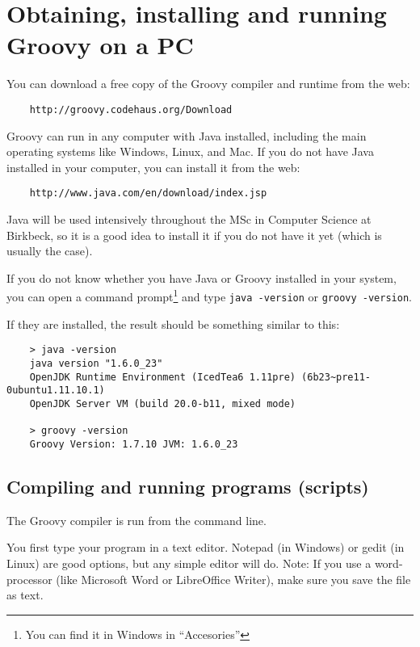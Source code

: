 \section{Obtaining, installing and running Groovy on a PC}
\label{sec:obta-inst-runn}
 
You can download a free copy of the Groovy compiler and runtime from the web:

\begin{verbatim}
    http://groovy.codehaus.org/Download
\end{verbatim}

Groovy can run in any computer with Java installed, including the main
operating systems like Windows, Linux, and Mac. If you do not have
Java installed in your computer, you can install it from the web:

\begin{verbatim}
    http://www.java.com/en/download/index.jsp
\end{verbatim}

Java will be used intensively throughout the MSc in Computer Science
at Birkbeck, so it is a good idea to install it if you do not have it
yet (which is usually the case).

If you do not know whether you have Java or Groovy installed in your
system, you can open a command prompt\footnote{You can find it in Windows in
  ``Accesories''} and type \verb+java -version+ or \verb+groovy -version+. 

If they are installed, the result should be something similar to this:

\begin{verbatim}
    > java -version
    java version "1.6.0_23"
    OpenJDK Runtime Environment (IcedTea6 1.11pre) (6b23~pre11-0ubuntu1.11.10.1)
    OpenJDK Server VM (build 20.0-b11, mixed mode)

    > groovy -version
    Groovy Version: 1.7.10 JVM: 1.6.0_23
\end{verbatim}



\subsection*{Compiling and running programs (scripts)}

The Groovy compiler is run from the command line.

You first type your program in a text editor. Notepad (in Windows) or
gedit (in Linux) are good options, but any simple editor will
do. Note: If you use a word-processor (like Microsoft Word or
LibreOffice Writer), make sure you save the file as text.

